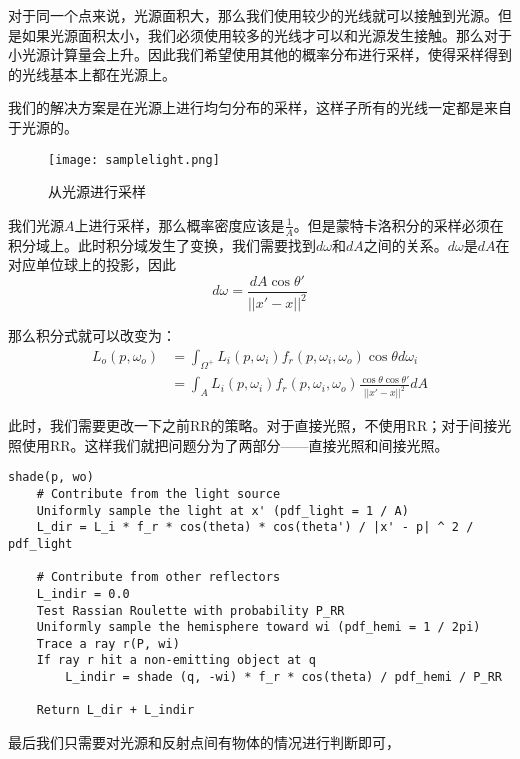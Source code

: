 \documentclass[openany]{progbookcn}
\begin{document}
对于同一个点来说，光源面积大，那么我们使用较少的光线就可以接触到光源。但是如果光源面积太小，我们必须使用较多的光线才可以和光源发生接触。那么对于小光源计算量会上升。因此我们希望使用其他的概率分布进行采样，使得采样得到的光线基本上都在光源上。

我们的解决方案是在光源上进行均匀分布的采样，这样子所有的光线一定都是来自于光源的。

\begin{figure}[H]
	\centering
	\texttt{[image: samplelight.png]}
	\caption{从光源进行采样}
	\label{fig:samplelight}
\end{figure}

我们光源$A$上进行采样，那么概率密度应该是$\frac{1}{A}$。但是蒙特卡洛积分的采样必须在积分域上。此时积分域发生了变换，我们需要找到$d\omega$和$dA$之间的关系。$d\omega$是$dA$在对应单位球上的投影，因此
\begin{equation}
	d\omega = \frac{dA\cos\theta'}{||x'-x||^2}
\end{equation}

那么积分式就可以改变为：
\begin{equation}
	\begin{split}
		L_o(p,\omega_o)&=\int_{\Omega^+}L_i(p,\omega_i)f_r(p,\omega_i,\omega_o)\cos\theta d\omega_i\\
		&=\int_AL_i(p,\omega_i)f_r(p,\omega_i,\omega_o)\frac{\cos\theta\cos\theta'}{||x'-x||^2}dA
	\end{split}
\end{equation}

此时，我们需要更改一下之前RR的策略。对于直接光照，不使用RR；对于间接光照使用RR。这样我们就把问题分为了两部分——直接光照和间接光照。

\begin{lstlisting}[caption=采用光源上均匀分布渲染函数伪代码]
shade(p, wo)
	# Contribute from the light source
	Uniformly sample the light at x' (pdf_light = 1 / A)
	L_dir = L_i * f_r * cos(theta) * cos(theta') / |x' - p| ^ 2 / pdf_light
	
	# Contribute from other reflectors
	L_indir = 0.0
	Test Rassian Roulette with probability P_RR
	Uniformly sample the hemisphere toward wi (pdf_hemi = 1 / 2pi)
	Trace a ray r(P, wi)
	If ray r hit a non-emitting object at q
		L_indir = shade (q, -wi) * f_r * cos(theta) / pdf_hemi / P_RR
	
	Return L_dir + L_indir
\end{lstlisting}

最后我们只需要对光源和反射点间有物体的情况进行判断即可，
\end{document}

